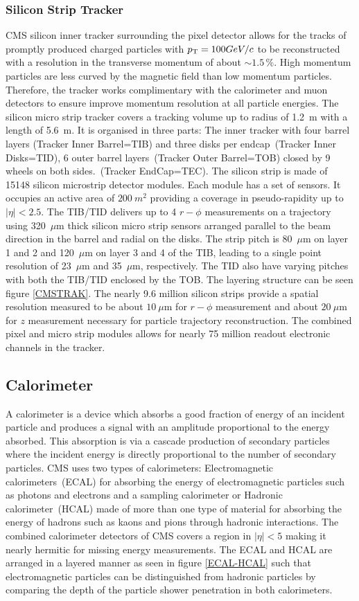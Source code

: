 \subsubsection{Silicon Strip Tracker}
CMS silicon inner tracker surrounding the pixel detector allows for the tracks of promptly produced charged particles with $p_{\mathrm{T}} = 100GeV/c$ to be reconstructed with a resolution in the transverse momentum \PT  of about $\sim 1.5\,\%$. High momentum particles are less curved by the magnetic field than low momentum particles. Therefore, the tracker works complimentary with the calorimeter and muon detectors to ensure improve momentum resolution at all particle energies.
The silicon micro strip tracker covers a tracking volume up to radius of 1.2~m with a length of 5.6~m. It is organised in three parts: The inner tracker with four barrel layers (Tracker Inner Barrel=TIB) and three disks per endcap~(Tracker Inner Disks=TID), 6 outer barrel layers~(Tracker Outer Barrel=TOB) closed by 9 wheels on both sides.~(Tracker EndCap=TEC). 
The silicon strip is made of 15148 silicon microstrip detector modules. Each module has a set of sensors. It occupies an active area of $200~m^{2}$ providing a coverage in pseudo-rapidity up to
 $|\eta| < 2.5 $.
 The TIB/TID delivers up to 4 $r-\phi$ measurements on a trajectory using 320~$\mu$m thick silicon micro strip sensors arranged  parallel to the beam direction in the barrel and radial on the disks. The strip pitch is 80~$\mu$m on layer 1 and 2 and 120~$\mu$m on layer 3 and 4 of the TIB, leading to a single point resolution of 23~$\mu$m and 35~$\mu$m, respectively. The TID also have varying pitches with both the TIB/TID enclosed by the TOB. The layering structure can be seen figure \eqref{CMSTRAK}. The nearly 9.6 million silicon strips provide a spatial resolution measured to be about $10~\mu$m for $r-\phi$ measurement and about $20~\mu$m for $z$ measurement necessary for particle trajectory reconstruction.
 The combined pixel and micro strip modules allows for nearly 75 million readout electronic channels in the tracker.
 

\subsection{Calorimeter}
A calorimeter is a device which absorbs a good fraction of energy of an incident particle and produces a signal with an amplitude proportional to the energy absorbed. This absorption is via a cascade production of secondary particles where the incident energy is directly proportional to the number of secondary particles. CMS uses two types of calorimeters: Electromagnetic calorimeters~(ECAL) for absorbing the energy of electromagnetic particles such as photons and electrons and a sampling calorimeter or Hadronic calorimeter~(HCAL) made of more than one type of material for absorbing the energy of hadrons such as kaons and pions through hadronic interactions. The combined calorimeter detectors of CMS covers a region in $|\eta| < 5 $ making it nearly hermitic for missing energy measurements. The ECAL and HCAL are arranged in a layered manner as seen in figure \eqref{ECAL-HCAL} such that electromagnetic particles can be distinguished from hadronic particles by comparing the depth of the particle shower penetration in both calorimeters.

